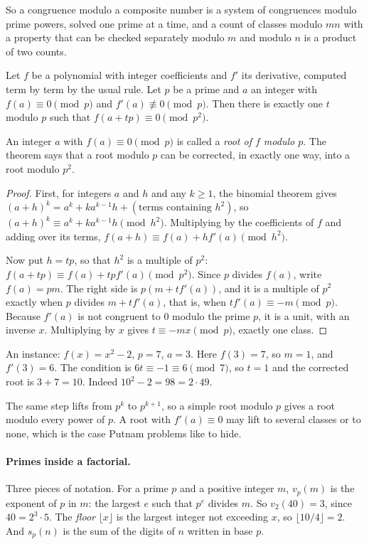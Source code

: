 So a congruence modulo a composite number is a system of congruences modulo prime powers, solved one prime at a time, and a count of classes modulo $mn$ with a property that can be checked separately modulo $m$ and modulo $n$ is a product of two counts.

\begin{theorem}
Let $f$ be a polynomial with integer coefficients and $f'$ its derivative, computed term by term by the usual rule. Let $p$ be a prime and $a$ an integer with $f(a) \equiv 0 \pmod p$ and $f'(a) \not\equiv 0 \pmod p$. Then there is exactly one $t$ modulo $p$ such that $f(a + tp) \equiv 0 \pmod{p^2}$.
\end{theorem}

An integer $a$ with $f(a) \equiv 0 \pmod p$ is called a \emph{root of $f$ modulo $p$}. The theorem says that a root modulo $p$ can be corrected, in exactly one way, into a root modulo $p^2$.

\begin{proof}
First, for integers $a$ and $h$ and any $k \ge 1$, the binomial theorem gives $(a + h)^k = a^k + k a^{k-1} h + (\text{terms containing } h^2)$, so $(a + h)^k \equiv a^k + k a^{k-1} h \pmod{h^2}$. Multiplying by the coefficients of $f$ and adding over its terms, $f(a + h) \equiv f(a) + h f'(a) \pmod{h^2}$.

Now put $h = tp$, so that $h^2$ is a multiple of $p^2$: $f(a + tp) \equiv f(a) + tp f'(a) \pmod{p^2}$. Since $p$ divides $f(a)$, write $f(a) = pm$. The right side is $p(m + t f'(a))$, and it is a multiple of $p^2$ exactly when $p$ divides $m + t f'(a)$, that is, when $t f'(a) \equiv -m \pmod p$. Because $f'(a)$ is not congruent to $0$ modulo the prime $p$, it is a unit, with an inverse $x$. Multiplying by $x$ gives $t \equiv -mx \pmod p$, exactly one class.
\end{proof}

An instance: $f(x) = x^2 - 2$, $p = 7$, $a = 3$. Here $f(3) = 7$, so $m = 1$, and $f'(3) = 6$. The condition is $6t \equiv -1 \equiv 6 \pmod 7$, so $t = 1$ and the corrected root is $3 + 7 = 10$. Indeed $10^2 - 2 = 98 = 2 \cdot 49$.

The same step lifts from $p^k$ to $p^{k+1}$, so a simple root modulo $p$ gives a root modulo every power of $p$. A root with $f'(a) \equiv 0$ may lift to several classes or to none, which is the case Putnam problems like to hide.

\paragraph{Primes inside a factorial.} Three pieces of notation. For a prime $p$ and a positive integer $m$, $v_p(m)$ is the exponent of $p$ in $m$: the largest $e$ such that $p^e$ divides $m$. So $v_2(40) = 3$, since $40 = 2^3 \cdot 5$. The \emph{floor} $\lfloor x \rfloor$ is the largest integer not exceeding $x$, so $\lfloor 10/4 \rfloor = 2$. And $s_p(n)$ is the sum of the digits of $n$ written in base $p$.

